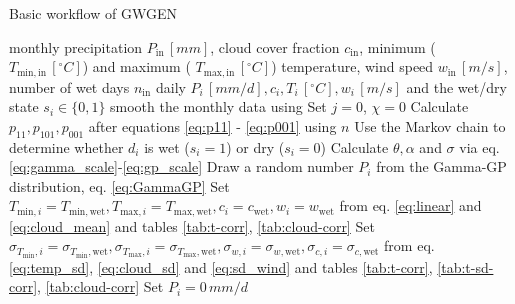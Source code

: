 \begin{refsection}
\begin{algorithm}
	\renewcommand{\algorithmicensure}{\textbf{Output:}}
	\caption{Basic workflow of GWGEN}
	\label{a:gwgen}
	\begin{algorithmic}[1]
		\REQUIRE monthly precipitation $P_\mathrm{in}\, [\unit{mm}]$, cloud cover fraction $c_\mathrm{in}$, minimum ( $T_{\mathrm{min}, \mathrm{in}}\, [^\circ\unit{C}]$) and maximum ( $T_{\mathrm{max}, \mathrm{in}}\, [^\circ\unit{C}]$) temperature, wind speed $w_\mathrm{in}\, [\unit{m/s}]$, number of wet days $n_\mathrm{in}$
		\ENSURE daily $P_i\, [\unit{mm/d}], c_i, T_i\, [^\circ\unit{C}], w_i \, [\unit{m/s}]$ and the wet/dry state $s_i\in\{0, 1\}$
		\STATE smooth the monthly data using \cite{RymesMyers2001}
		\STATE Set $j=0$, $\chi = 0$
		 \label{a:gwgen:accuracy-criteria}
		\STATE Calculate $p_{11}, p_{101}, p_{001}$ after equations \eqref{eq:p11} - \eqref{eq:p001} using $n$ 				 \label{a:gwgen:markov}
		\STATE Use the Markov chain to determine whether $d_i$ is wet ($s_i = 1$) or dry ($s_i = 0$)
		\STATE Calculate $\theta, \alpha$ and $\sigma$ via eq. \eqref{eq:gamma_scale}-\eqref{eq:gp_scale} 
		\STATE Draw a random number $P_i$ from the Gamma-GP distribution, eq. \eqref{eq:GammaGP}
		\STATE Set $T_{\mathrm{min}, i} = T_{\mathrm{min}, \mathrm{wet}}, T_{\mathrm{max}, i} = T_{\mathrm{max}, \mathrm{wet}}, c_i = c_\mathrm{wet}, w_i = w_\mathrm{wet}$ from eq. \eqref{eq:linear} and \eqref{eq:cloud_mean} and tables \ref{tab:t-corr}, \ref{tab:cloud-corr} \label{a:gwgen:adjust_wet}
		\STATE Set $
		\sigma_{T_\mathrm{min},i} = \sigma_{T_\mathrm{min},\mathrm{wet}}, \sigma_{T_\mathrm{max},i} = \sigma_{T_\mathrm{max},\mathrm{wet}}, \sigma_{w,i} = \sigma_{w,\mathrm{wet}}, \sigma_{c,i} = \sigma_{c,\mathrm{wet}}$ from eq. \eqref{eq:temp_sd}, \eqref{eq:cloud_sd} and \eqref{eq:sd_wind} and tables \ref{tab:t-corr}, \ref{tab:t-sd-corr}, \ref{tab:cloud-corr}
		\ELSE
		\STATE Set $P_i = 0\,\unit{mm/d}$

\end{algorithmic}
\end{algorithm}
\end{refsection}
